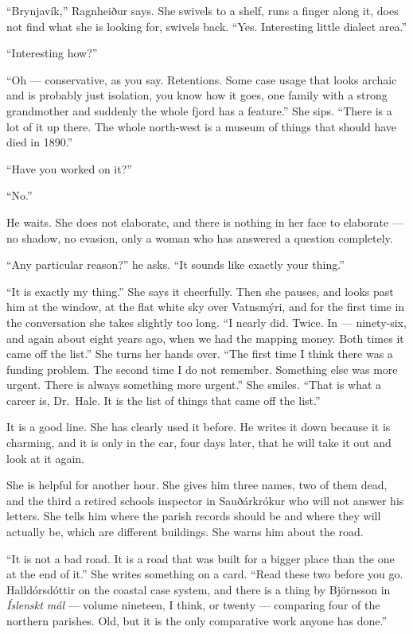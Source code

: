 \documentclass[11pt,oneside]{book}
\begin{document}
``Brynjavík,'' Ragnheiður says. She swivels to a shelf, runs a finger
along it, does not find what she is looking for, swivels back. ``Yes.
Interesting little dialect area.''

``Interesting how?''

``Oh --- conservative, as you say. Retentions. Some case usage that
looks archaic and is probably just isolation, you know how it goes, one
family with a strong grandmother and suddenly the whole fjord has a
feature.'' She sips. ``There is a lot of it up there. The whole
north-west is a museum of things that should have died in 1890.''

``Have you worked on it?''

``No.''

He waits. She does not elaborate, and there is nothing in her face to
elaborate --- no shadow, no evasion, only a woman who has answered a
question completely.

``Any particular reason?'' he asks. ``It sounds like exactly your
thing.''

``It is exactly my thing.'' She says it cheerfully. Then she pauses, and
looks past him at the window, at the flat white sky over Vatnsmýri, and
for the first time in the conversation she takes slightly too long.
``I nearly did. Twice. In --- ninety-six, and again about eight years
ago, when we had the mapping money. Both times it came off the list.''
She turns her hands over. ``The first time I think there was a funding
problem. The second time I do not remember. Something else was more
urgent. There is always something more urgent.'' She smiles. ``That is
what a career is, Dr.~Hale. It is the list of things that came off the
list.''

It is a good line. She has clearly used it before. He writes it down
because it is charming, and it is only in the car, four days later, that
he will take it out and look at it again.

She is helpful for another hour. She gives him three names, two of them
dead, and the third a retired schools inspector in Sauðárkrókur who will
not answer his letters. She tells him where the parish records should
be and where they will actually be, which are different buildings. She
warns him about the road.

``It is not a bad road. It is a road that was built for a bigger place
than the one at the end of it.'' She writes something on a card. ``Read
these two before you go. Halldórsdóttir on the coastal case system, and
there is a thing by Björnsson in \emph{Íslenskt mál} --- volume
nineteen, I think, or twenty --- comparing four of the northern parishes.
Old, but it is the only comparative work anyone has done.''
\end{document}
